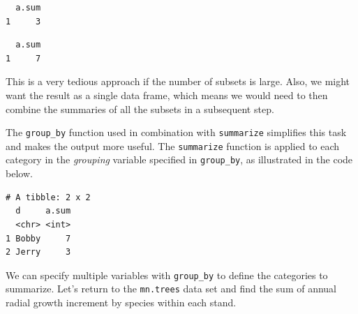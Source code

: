 \documentclass[]{krantz}
\makeatletter
\newenvironment{Shaded}{\begin{snugshade}}{\end{snugshade}}
\newcommand{\DataTypeTok}[1]{\textcolor[rgb]{0.27,0.27,0.27}{#1}}
\newcommand{\KeywordTok}[1]{\textcolor[rgb]{0.27,0.27,0.27}{\textbf{#1}}}
\newcommand{\NormalTok}[1]{#1}
\newcommand{\OperatorTok}[1]{\textcolor[rgb]{0.43,0.43,0.43}{\textbf{#1}}}
\newcommand{\StringTok}[1]{\textcolor[rgb]{0.5,0.5,0.5}{#1}}
\newenvironment{kframe}{%
\medskip{}
\setlength{\fboxsep}{.8em}
 \def\at@end@of@kframe{}%
 \ifinner\ifhmode%
  \def\at@end@of@kframe{\end{minipage}}%
  \begin{minipage}{\columnwidth}%
 \fi\fi%
 \def\FrameCommand##1{\hskip\@totalleftmargin \hskip-\fboxsep
 \colorbox{shadecolor}{##1}\hskip-\fboxsep
     \hskip-\linewidth \hskip-\@totalleftmargin \hskip\columnwidth}%
 \MakeFramed {\advance\hsize-\width
   \@totalleftmargin\z@ \linewidth\hsize
   \@setminipage}}%
 {\par\unskip\endMakeFramed%
 \at@end@of@kframe}
\renewenvironment{Shaded}{\begin{kframe}}{\end{kframe}}
\makeatother
\begin{document}
\begin{verbatim}
  a.sum
1     3
\end{verbatim}

\begin{Shaded}
\end{Shaded}

\begin{verbatim}
  a.sum
1     7
\end{verbatim}

This is a very tedious approach if the number of subsets is large. Also, we might want the result as a single data frame, which means we would need to then combine the summaries of all the subsets in a subsequent step.

The \texttt{group\_by} function used in combination with \texttt{summarize} simplifies this task and makes the output more useful. The \texttt{summarize} function is applied to each category in the \emph{grouping} variable specified in \texttt{group\_by}, as illustrated in the code below.

\begin{Shaded}
\end{Shaded}

\begin{verbatim}
# A tibble: 2 x 2
  d     a.sum
  <chr> <int>
1 Bobby     7
2 Jerry     3
\end{verbatim}

We can specify multiple variables with \texttt{group\_by} to define the categories to summarize. Let's return to the \texttt{mn.trees} data set and find the sum of annual radial growth increment by species within each stand.

\begin{Shaded}
\end{Shaded}
\end{document}
